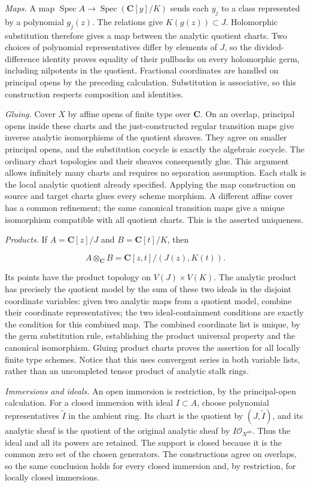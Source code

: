 \documentclass[11pt]{article}
\begin{document}
\emph{Maps.} A map
\(\operatorname{Spec}A\to\operatorname{Spec}(\mathbf C[y]/K)\) sends
each \(y_j\) to a class represented by a polynomial \(g_j(z)\). The
relations give \(K(g(z))\subset J\). Holomorphic substitution therefore
gives a map between the analytic quotient charts. Two choices of
polynomial representatives differ by elements of \(J\), so the
divided-difference identity proves equality of their pullbacks on every
holomorphic germ, including nilpotents in the quotient. Fractional
coordinates are handled on principal opens by the preceding calculation.
Substitution is associative, so this construction respects composition
and identities.

\emph{Gluing.} Cover \(X\) by affine opens of finite type over
\(\mathbf C\). On an overlap, principal opens inside these charts and
the just-constructed regular transition maps give inverse analytic
isomorphisms of the quotient sheaves. They agree on smaller principal
opens, and the substitution cocycle is exactly the algebraic cocycle.
The ordinary chart topologies and their sheaves consequently glue. This
argument allows infinitely many charts and requires no separation
assumption. Each stalk is the local analytic quotient already specified.
Applying the map construction on source and target charts glues every
scheme morphism. A different affine cover has a common refinement; the
same canonical transition maps give a unique isomorphism compatible with
all quotient charts. This is the asserted uniqueness.

\emph{Products.} If \(A=\mathbf C[z]/J\) and \(B=\mathbf C[t]/K\), then

\[
A\otimes_{\mathbf C}B=\mathbf C[z,t]/(J(z),K(t)).
\]

Its points have the product topology on \(V(J)\times V(K)\). The
analytic product has precisely the quotient model by the sum of these
two ideals in the disjoint coordinate variables: given two analytic maps
from a quotient model, combine their coordinate representatives; the two
ideal-containment conditions are exactly the condition for this combined
map. The combined coordinate list is unique, by the germ substitution
rule, establishing the product universal property and the canonical
isomorphism. Gluing product charts proves the assertion for all locally
finite type schemes. Notice that this uses convergent series in both
variable lists, rather than an uncompleted tensor product of analytic
stalk rings.

\emph{Immersions and ideals.} An open immersion is restriction, by the
principal-open calculation. For a closed immersion with ideal
\(I\subset A\), choose polynomial representatives \(\widetilde I\) in
the ambient ring. Its chart is the quotient by \((J,\widetilde I)\), and
its analytic sheaf is the quotient of the original analytic sheaf by
\(I\mathcal O_{X^{\mathrm{an}}}\). Thus the ideal and all its powers are
retained. The support is closed because it is the common zero set of the
chosen generators. The constructions agree on overlaps, so the same
conclusion holds for every closed immersion and, by restriction, for
locally closed immersions.
\end{document}
